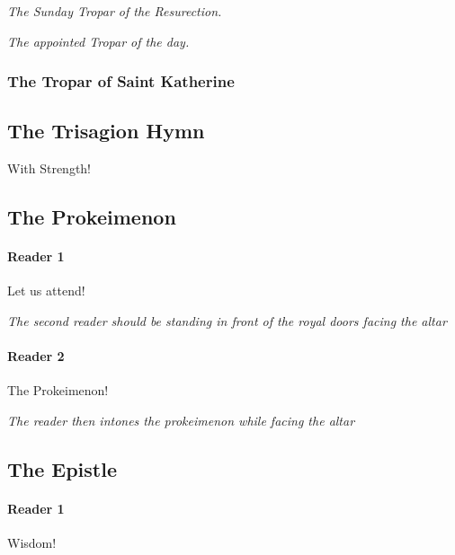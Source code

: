 \documentclass[twoside, letterpaper, 12pt]{report}
\begin{document}
			\people \emph{The Sunday Tropar of the Resurection.}

			\reader \glory

			\people \emph{The appointed Tropar of the day.}

			\reader \nowandever

			\subsubsection*{The Tropar of Saint Katherine}

			\lilytroparkatherine

			\reader \throughtheprayers

			\lilyamen

		\subsection*{The Trisagion Hymn}

			\lilytrisagiona

			\reader With Strength!

			\lilytrisagionb

		\subsection*{The Prokeimenon}

			\paragraph{Reader 1} Let us attend!

				\emph{The second reader should be standing in front of the royal doors facing the altar}

			\paragraph{Reader 2} The Prokeimenon!

				\emph{The reader then intones the prokeimenon while facing the altar}

		\subsection*{The Epistle}

			\paragraph{Reader 1} Wisdom!
\end{document}
